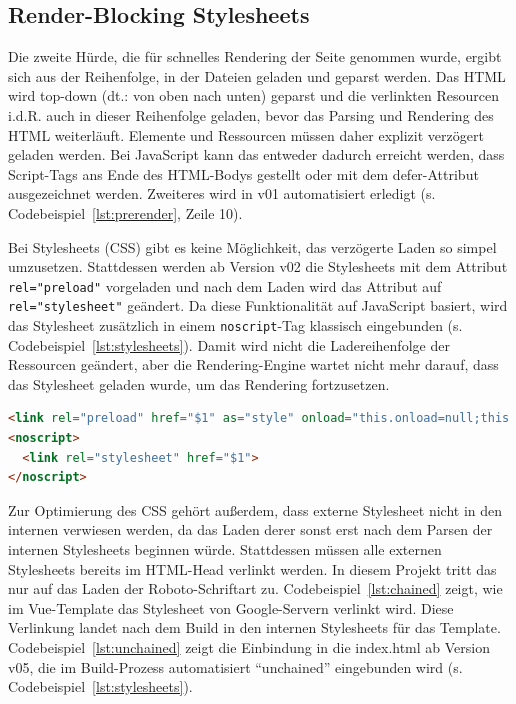 \documentclass[11pt,a4paper]{article}
\begin{document}
\subsection{Render-Blocking Stylesheets}
Die zweite Hürde, die für schnelles Rendering der Seite genommen wurde, ergibt sich aus der Reihenfolge, in der Dateien geladen und geparst werden.
Das HTML wird top-down (dt.: von oben nach unten) geparst und die verlinkten Resourcen i.d.R. auch in dieser Reihenfolge geladen, bevor das Parsing und Rendering des HTML weiterläuft.
Elemente und Ressourcen müssen daher explizit verzögert geladen werden.
Bei JavaScript kann das entweder dadurch erreicht werden, dass Script-Tags ans Ende des HTML-Bodys gestellt oder mit dem defer-Attribut ausgezeichnet werden.
Zweiteres wird in v01 automatisiert erledigt (s. Codebeispiel~\ref{lst:prerender}, Zeile 10).

Bei Stylesheets (CSS) gibt es keine Möglichkeit, das verzögerte Laden so simpel umzusetzen.
Stattdessen werden ab Version v02 die Stylesheets mit dem Attribut \verb|rel="preload"| vorgeladen und nach dem Laden wird das Attribut auf \verb|rel="stylesheet"| geändert.
Da diese Funktionalität auf JavaScript basiert, wird das Stylesheet zusätzlich in einem \verb|noscript|-Tag klassisch eingebunden (s. Codebeispiel~\ref{lst:stylesheets}). 
Damit wird nicht die Ladereihenfolge der Ressourcen geändert, aber die Rendering-Engine wartet nicht mehr darauf, dass das Stylesheet geladen wurde, um das Rendering fortzusetzen.

\begin{lstlisting}[language=html, caption={Entfernte Render-Blocking Stylesheets (\enquote{\$1} steht für den jeweiligen Quellpfad für das Stylesheet)}, label={lst:stylesheets}]
<link rel="preload" href="$1" as="style" onload="this.onload=null;this.rel='stylesheet'">
<noscript>
  <link rel="stylesheet" href="$1">
</noscript>
\end{lstlisting}

Zur Optimierung des CSS gehört außerdem, dass externe Stylesheet nicht in den internen verwiesen werden, da das Laden derer sonst erst nach dem Parsen der internen Stylesheets beginnen würde.
Stattdessen müssen alle externen Stylesheets bereits im HTML-Head verlinkt werden.
In diesem Projekt tritt das nur auf das Laden der Roboto-Schriftart zu.
Codebeispiel~\ref{lst:chained} zeigt, wie im Vue-Template das Stylesheet von Google-Servern verlinkt wird.
Diese Verlinkung landet nach dem Build in den internen Stylesheets für das Template.
Codebeispiel~\ref{lst:unchained} zeigt die Einbindung in die index.html ab Version v05, die im Build-Prozess automatisiert \enquote{unchained} eingebunden wird (s. Codebeispiel~\ref{lst:stylesheets}).
\end{document}
